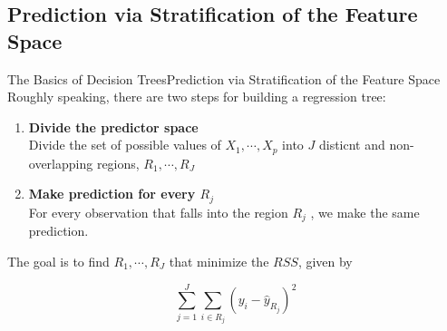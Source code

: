 \subsection{Prediction via Stratification of the Feature Space}
\begin{frame}{The Basics of Decision Trees}{Prediction via Stratification of the Feature Space}
    Roughly speaking, there are two steps for building a regression tree: \pause 

    \begin{enumerate}
        \item \textbf{Divide the predictor space} \\ \pause
        Divide the set of possible values of $X_1, \cdots, X_p$ into $J$ disticnt and non-overlapping regions, $R_1, \cdots, R_J$ \pause 

        \item \textbf{Make prediction for every $R_j$} \\ \pause 
        For every observation that falls into the region $R_j$ , we make the same prediction. \pause 
    \end{enumerate}

    The goal is to find $R_1, \cdots, R_J$ that minimize the $RSS$, given by \pause 

    \begin{equation*}
        \sum_{j=1}^J \sum_{i \in R_j} (y_i - \hat{y}_{R_j})^2
    \end{equation*}


\end{frame}


